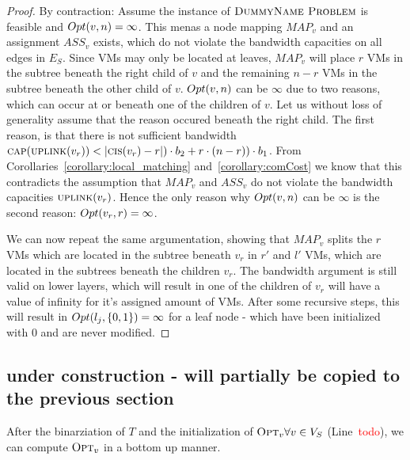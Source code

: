 \documentclass[9pt,twocolumn]{scrartcl}
\newcommand{\Capacity}{\ensuremath{\textsc{cap}}}
\newcommand{\Problem}{\textsc{DummyName Problem}}
\newcommand{\carlo}[1]{\textcolor{red}{#1}}
\newcommand{\VmChunkAssignment}{\ensuremath{ASS_v}}
\newcommand{\NodeMapping}{\ensuremath{MAP_v}}
\newcommand{\SubstrateNodes}{\ensuremath{V_S}}
\newcommand{\SubstrateEdges}{\ensuremath{E_S}}
\newcommand{\SubstrateNode}{\ensuremath{v}}
\newcommand{\Leaf}{\ensuremath{l}}
\newcommand{\Tree}{\ensuremath{T}}
\newcommand{\CostCom}{\ensuremath{b_1}}
\newcommand{\CostTrans}{\ensuremath{b_2}}
\newcommand{\Vms}{\ensuremath{n}}
\begin{document}
\begin{proof}
By contraction: Assume the instance of $\Problem$ is feasible and
$\Opt(\SubstrateNode,\Vms) = \infty$. This menas a node mapping $\NodeMapping$
and an assignment $\VmChunkAssignment$ exists, which do not violate the
bandwidth capacities on all edges in $\SubstrateEdges$. Since VMs may only be
located at leaves, $\NodeMapping$ will place $r$ VMs in the subtree beneath the
right child of $\SubstrateNode$ and the remaining $\Vms - r$ VMs in the subtree
beneath the other child of $\SubstrateNode$.
$\Opt(\SubstrateNode,\Vms)$ can be $\infty$ due to two reasons, which can occur
at or beneath one of the children of $\SubstrateNode$. Let us without loss of
generality assume that the reason occured beneath the right child. The first
reason, is that there is not sufficient bandwidth
$\Capacity(\Uplink(\SubstrateNode_r)) < |\ChunkCount(\SubstrateNode_{r}) - r|)
\cdot \CostTrans + r \cdot (\Vms - r)) \cdot \CostCom$. From
Corollaries~\ref{corollary:local_matching} and~\ref{corollary:comCost} we know
that this contradicts the assumption that $\NodeMapping$
and $\VmChunkAssignment$ do not violate the bandwidth capacities
$\Uplink(\SubstrateNode_r)$. Hence the only reason why
$\Opt(\SubstrateNode,\Vms)$ can be $\infty$ is the second reason:
$\Opt(\SubstrateNode_r, r) = \infty$.

We can now repeat the same argumentation, showing that $\NodeMapping$ splits
the $r$ VMs which are located in the subtree beneath $\SubstrateNode_r$ in $r'$
and $l'$ VMs, which are located in the subtrees beneath the
children $\SubstrateNode_r$. The bandwidth argument is still valid on lower
layers, which will result in one of the children of $\SubstrateNode_r$ will
have a value of infinity for it's assigned amount of VMs. After some
recursive steps, this will result in $\Opt(\Leaf_j, \{0,1\}) = \infty$
for a leaf node - which have been initialized with $0$ and
are never modified.
\end{proof}



\subsection{under construction - will partially be copied to the previous
section}

After the binarziation of $\Tree$ and the initialization of
$\OPT_\SubstrateNode \forall \SubstrateNode \in \SubstrateNodes$
(Line~\carlo{todo}), we can compute $\OPT_\SubstrateNode$ in a bottom up
manner.
\end{document}
